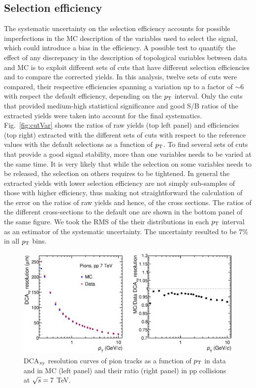 \subsection{Selection efficiency}
\label{sec:CutVariation}
The systematic uncertainty on the selection efficiency accounts for 
possible imperfections in the MC description of the variables used to select the signal, 
which could introduce a bias in the efficiency. A possible test to quantify the effect of any discrepancy in the 
description of topological variables between data and MC is to exploit different sets of cuts
that have different selection efficiencies and to compare the corrected
yields. In this analysis, twelve sets of cuts were compared, 
their respective efficiencies spanning a variation up to 
a factor of $\sim$6 with respect the default efficiency, depending on the $p_{\rm T}$ interval.
Only the cuts that provided 
medium-high statistical significance and good S/B ratios of the extracted yields
were taken into account for the final systematics.
Fig.~\ref{fig:cutVar} shows the ratios of raw yields (top left panel) and efficiencies (top right) 
extracted with the different sets of cuts with respect
to the reference values with the default selections as a function of $p_{\rm T}$.
To find several sets of cuts that provide a good signal stability, 
more than one variables needs to be varied at the same time. It is very likely that
while the selection on some variables needs to be released, the selection
on others requires to be tightened. In general the extracted yields with lower selection efficiency are not simply
sub-samples of those with higher efficiency, thus making not straightforward the calculation
of the error on the ratios of raw yields and hence, of the cross sections.
The ratios of the different cross-sections to the default one are shown in the bottom panel of the
same figure. We took the RMS of the their distributions in each $p_{\rm T}$ interval as an estimator of 
the systematic uncertainty. The uncertainty resulted to be 7\% in all $p_{\rm T}$ bins.
\begin{figure}[!h]
\begin{center}
 \includegraphics[width=1\textwidth]{FigCap4/DCAxyReso_Pions.eps}
\caption{DCA$_{\rm xy}$ resolution curves of pion tracks as a function of $p_{\rm T}$ in data and in MC (left panel) and their ratio (right panel) in pp collisions at $\sqrt{s} = 7 $ TeV.}             
\label{fig:DCAxyReso}
\end{center}
\end{figure}
